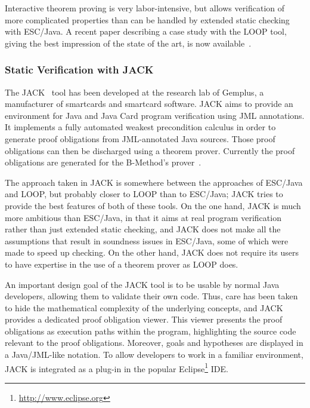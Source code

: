 Interactive theorem proving is very labor-intensive, but allows
verification of more complicated properties than can be handled by
extended static checking with ESC/Java.  A recent paper describing a
case study with the LOOP tool, giving the best impression of the state
of the art, is now available~\cite{BreunesseBJ02}.

% 

\subsubsection{Static Verification with JACK}
\label{jack}

The JACK~\cite{JACK} tool has been developed at the research lab
of Gemplus, a manufacturer of smartcards and smartcard software.  JACK
aims to provide an environment for Java and Java Card program
verification using JML annotations.  It implements a fully automated
weakest precondition calculus in order to generate proof obligations
from JML-annotated Java sources. Those proof obligations can then be
discharged using a theorem prover.  Currently the proof obligations
are generated for the B-Method's prover~\cite{Abrial96}.

The approach taken in JACK is somewhere between the approaches of ESC/Java and
LOOP, but probably closer to LOOP than to ESC/Java; JACK tries to
provide the best features of both of these tools.
On the one hand, JACK is much more
ambitious than ESC/Java, in that it aims at real program verification
rather than just extended static checking, and JACK does not make all
the assumptions that result in soundness issues in ESC/Java, some of
which were made to speed up checking.  On the other hand, JACK does
not require its users to have expertise in the use of a theorem prover
as LOOP does.

An important design goal of the JACK tool is to be usable by normal
Java developers, allowing them to validate their own code.  Thus, care has
been taken to hide the mathematical complexity of the
underlying concepts, and JACK provides a dedicated proof obligation
viewer. This viewer presents the proof obligations as execution paths
within the program, highlighting the source code relevant to the proof
obligations. Moreover, goals and hypotheses are displayed in a
Java/JML-like notation.  To allow developers to work in a familiar
environment, JACK is integrated as a plug-in in the
popular Eclipse\footnote{\url{http://www.eclipse.org}} IDE\@.

